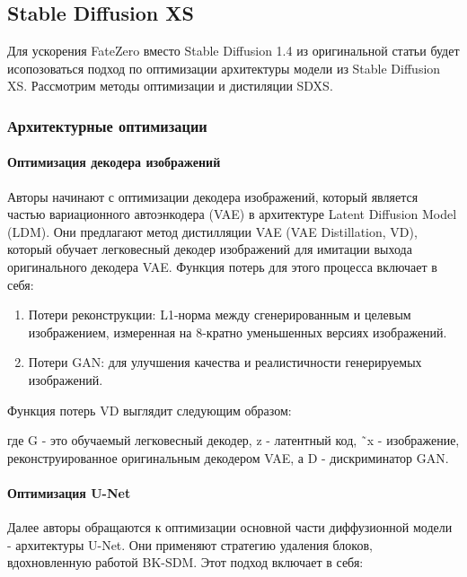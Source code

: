 \subsection{Stable Diffusion XS \texorpdfstring{\cite{sdxs}}{Stable Diffusion XS}}

Для ускорения FateZero вместо Stable Diffusion 1.4 из оригинальной статьи будет исопозоваться подход по оптимизации архитектуры модели из Stable Diffusion XS. Рассмотрим методы оптимизации и дистиляции SDXS.

\subsubsection{Архитектурные оптимизации}

\paragraph{Оптимизация декодера изображений}

Авторы начинают с оптимизации декодера изображений, который является частью вариационного автоэнкодера (VAE) в архитектуре Latent Diffusion Model (LDM). Они предлагают метод дистилляции VAE (VAE Distillation, VD), который обучает легковесный декодер изображений для имитации выхода оригинального декодера VAE. Функция потерь для этого процесса включает в себя:


\begin{enumerate}
    \item  Потери реконструкции: L1-норма между сгенерированным и целевым изображением, измеренная на 8-кратно уменьшенных версиях изображений.
    \item  Потери GAN: для улучшения качества и реалистичности генерируемых изображений.
\end{enumerate}

Функция потерь VD выглядит следующим образом:


где G - это обучаемый легковесный декодер, z - латентный код, ˜x - изображение, реконструированное оригинальным декодером VAE, а D - дискриминатор GAN.

\paragraph{Оптимизация U-Net}

Далее авторы обращаются к оптимизации основной части диффузионной модели - архитектуры U-Net. Они применяют стратегию удаления блоков, вдохновленную работой BK-SDM. Этот подход включает в себя:

